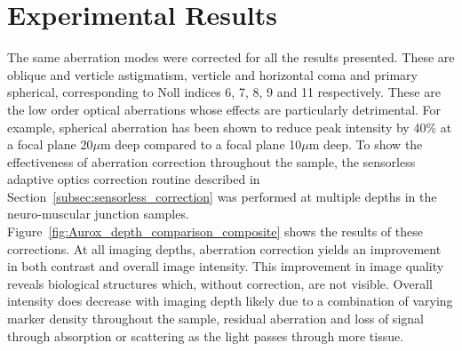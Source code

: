 \section{Experimental Results}
\label{sec:Aurox_results}

The same aberration modes were corrected for all the results presented. 
These are oblique and verticle astigmatism, verticle and horizontal coma 
and primary spherical, corresponding to Noll indices 6, 7, 8, 9 and 11 
respectively.\cite{noll1976zernike} These are the low order optical 
aberrations whose effects are particularly detrimental. For example, 
spherical aberration has been shown to reduce peak intensity by 40\% at
a focal plane 20$\mu$m deep compared to a focal plane 10$\mu$m 
deep.\cite{hell1993aberrations} To show the effectiveness of aberration 
correction throughout the sample, the sensorless adaptive optics correction
routine described in Section~\ref{subsec:sensorless_correction} was performed
at multiple depths in the neuro-muscular junction samples. Figure~\ref{fig:Aurox_depth_comparison_composite} shows the results of 
these corrections. At all imaging depths, aberration correction yields an 
improvement in both contrast and overall image intensity. This improvement 
in image quality reveals biological structures which, without correction, 
are not visible. Overall intensity does decrease with imaging depth likely 
due to a combination of varying marker density throughout the sample, 
residual aberration and loss of signal through absorption or scattering 
as the light passes through more tissue.

